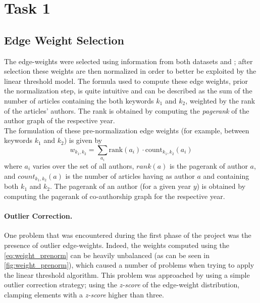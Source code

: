 \section{Task 1}

\subsection{Edge Weight Selection}\label{sec:weights}
The edge-weights were selected using information from  both datasets \DSone{} and \DStwo{}; after selection  these weights are then normalized in order to better be exploited by the linear threshold model. The formula used to compute these edge weights, prior the normalization step, is quite intuitive and can be described as the sum of the number of articles containing the both keywords $k_1$ and $k_2$, weighted by the rank of the articles' authors. The rank is obtained by computing the \textit{pagerank} of the author graph of the respective year.\\
The formulation of these pre-normalization edge weights (for example, between keywords $k_1$ and $k_2$) is given by
\begin{equation}\label{eq:weight_prenorm}
w_{k_1,k_2}=\sum_{a_i} \mathrm{rank}(a_i)\cdot \mathrm{count}_{k_1,k_2}(a_i)    
\end{equation}
where $a_i$ varies over the set of all authors, ${rank}(a)$ is the pagerank of author $a$, and ${count}_{k_1, k_2}(a)$ is the number of articles having as author $a$ and containing both $k_1$ and $k_2$.
The pagerank of an author (for a given year $y$) is obtained by computing the pagerank of co-authorship graph for the respective year.

\paragraph{\textbf{Outlier Correction.}} One problem that was encountered during the first phase of the project was the presence of outlier edge-weights. Indeed, the weights computed using the \cref{eq:weight_prenorm} can be heavily unbalanced (as can be seen in  \cref{fig:weight_prenorm}), which caused a number of problems when trying to apply the linear threshold algorithm. This problem was approached by using a simple outlier correction strategy; using the \textit{z-score} of the edge-weight distribution, clamping elements with a \textit{z-score} higher than three.

